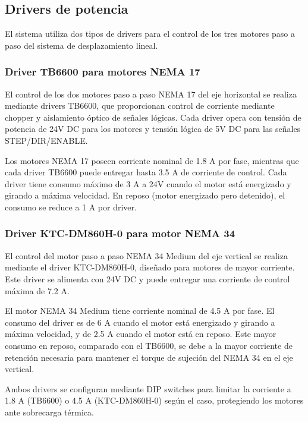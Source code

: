 \subsection{Drivers de potencia}

El sistema utiliza dos tipos de drivers para el control de los tres motores paso a paso del sistema de desplazamiento lineal.

\subsubsection{Driver TB6600 para motores NEMA 17}

El control de los dos motores paso a paso NEMA 17 del eje horizontal se realiza mediante drivers TB6600, que proporcionan control de corriente mediante chopper y aislamiento óptico de señales lógicas. Cada driver opera con tensión de potencia de 24V DC para los motores y tensión lógica de 5V DC para las señales STEP/DIR/ENABLE.

Los motores NEMA 17 poseen corriente nominal de 1.8 A por fase, mientras que cada driver TB6600 puede entregar hasta 3.5 A de corriente de control. Cada driver tiene consumo máximo de 3 A a 24V cuando el motor está energizado y girando a máxima velocidad. En reposo (motor energizado pero detenido), el consumo se reduce a 1 A por driver.

\subsubsection{Driver KTC-DM860H-0 para motor NEMA 34}

El control del motor paso a paso NEMA 34 Medium del eje vertical se realiza mediante el driver KTC-DM860H-0, diseñado para motores de mayor corriente. Este driver se alimenta con 24V DC y puede entregar una corriente de control máxima de 7.2 A.

El motor NEMA 34 Medium tiene corriente nominal de 4.5 A por fase. El consumo del driver es de 6 A cuando el motor está energizado y girando a máxima velocidad, y de 2.5 A cuando el motor está en reposo. Este mayor consumo en reposo, comparado con el TB6600, se debe a la mayor corriente de retención necesaria para mantener el torque de sujeción del NEMA 34 en el eje vertical.

Ambos drivers se configuran mediante DIP switches para limitar la corriente a 1.8 A (TB6600) o 4.5 A (KTC-DM860H-0) según el caso, protegiendo los motores ante sobrecarga térmica.
